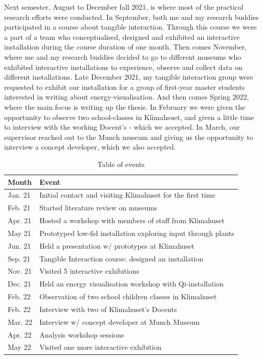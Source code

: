 Next semester, August to December fall 2021, is where most of the practical research efforts were conducted. In September, both me and my research buddies participated in a course about tangible interaction. Through this course we were a part of a team who conceptualised, designed and exhibited an interactive installation during the course duration of one month. Then comes November, where me and my research buddies decided to go to different museums who exhibited interactive installations to experience, observe and collect data on different installations. Late December 2021, my tangible interaction group were requested to exhibit our installation for a group of first-year master students interested in writing about energy-visualisation. And then comes Spring 2022, where the main focus is writing up the thesis. In February we were given the opportunity to observe two school-classes in Klimahsuet, and given a little time to interview with the working Docent's - which we accepted. In March, our supervisor reached out to the Munch museum and giving us the opportunity to interview a concept developer, which we also accepted.

\begin{table}[h]
\centering
\begin{tabular}{l | l}
\textbf{Month} & \textbf{Event}\\
\hline
Jan. 21 & Initial contact and visiting Klimahuset for the first time \\
Feb. 21 & Started literature review on museums \\
Apr. 21 & Hosted a workshop with members of staff from Klimahuset \\
May 21 & Prototyped low-fid installation exploring input through plants \\
Jun. 21 & Held a presentation w/ prototypes at Klimahuset \\
Sep. 21 & Tangible Interaction course: designed an installation \\
Nov. 21 & Visited 5 interactive exhibitions \\
Dec. 21 & Held an energy visualisation workshop with Qi-installation \\
Feb. 22 & Observation of two school children classes in Klimahuset \\
Feb. 22 & Interview with two of Klimahuset's Docents \\
Mar. 22 & Interview w/ concept developer at Munch Museum \\
Apr. 22 & Analysis workshop sessions \\
May 22 & Visited one more interactive exhibition \\
\end{tabular}
\caption{Table of events}
\label{tab:abc}
\end{table}

